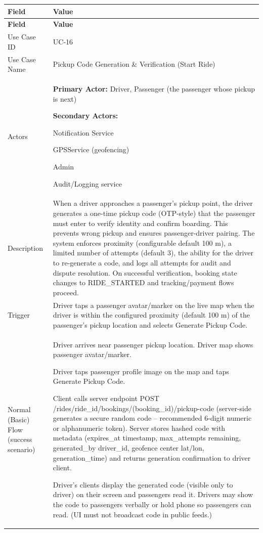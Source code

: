 \begin{longtable}{|p{3.5cm}|p{12cm}|}
\hline
\rowcolor{lightgray!30}
\textbf{Field} & \textbf{Value} \\
\hline
\endfirsthead
\hline
\rowcolor{lightgray!30}
\textbf{Field} & \textbf{Value} \\
\hline
\endhead
\hline
\endfoot
Use Case ID & UC-16 \\
\hline
Use Case Name & Pickup Code Generation \& Verification (Start Ride) \\
\hline
Actors &
\textbf{Primary Actor:} Driver, Passenger (the passenger whose pickup is next)

\textbf{Secondary Actors:}

Notification Service

GPSService (geofencing)

Admin

Audit/Logging service \\
\hline
Description &
When a driver approaches a passenger’s pickup point, the driver generates a one-time pickup code (OTP-style) that the passenger must enter to verify identity and confirm boarding. This prevents wrong pickup and ensures passenger-driver pairing. The system enforces proximity (configurable default 100 m), a limited number of attempts (default 3), the ability for the driver to re-generate a code, and logs all attempts for audit and dispute resolution. On successful verification, booking state changes to RIDE\_STARTED and tracking/payment flows proceed. \\
\hline
Trigger &
Driver taps a passenger avatar/marker on the live map when the driver is within the configured proximity (default 100 m) of the passenger’s pickup location and selects Generate Pickup Code. \\
\hline
Normal (Basic) Flow (success scenario) &
Driver arrives near passenger pickup location. Driver map shows passenger avatar/marker.

Driver taps passenger profile image on the map and taps Generate Pickup Code.

Client calls server endpoint POST /rides/ride\_id/bookings/(booking\_id)/pickup-code (server-side generates a secure random code – recommended 6-digit numeric or alphanumeric token). Server stores hashed code with metadata (expires\_at timestamp, max\_attempts remaining, generated\_by driver\_id, geofence center lat/lon, generation\_time) and returns generation confirmation to driver client.

Driver’s clients display the generated code (visible only to driver) on their screen and passengers read it. Drivers may show the code to passengers verbally or hold phone so passengers can read. (UI must not broadcast code in public feeds.)


\end{longtable}
